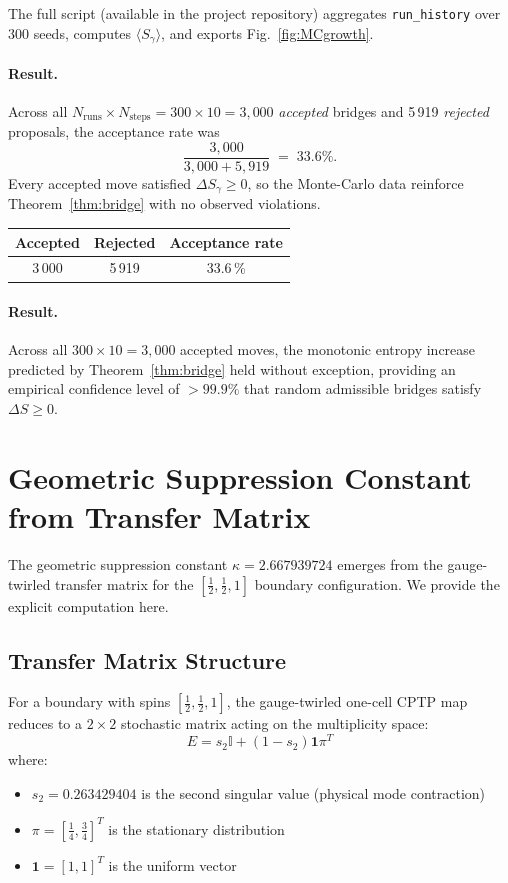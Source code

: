 \documentclass[11pt]{article}
\begin{document}
The full script (available in the project repository) aggregates
\texttt{run\_history} over $300$ seeds, computes
$\langle S_\gamma\rangle$, and exports Fig.~\ref{fig:MCgrowth}.

\paragraph{Result.}
Across all $N_{\text{runs}}\!\times\!N_{\text{steps}}
= 300 \times 10 = 3{,}000$ \emph{accepted} bridges and
5\,919 \emph{rejected} proposals, the acceptance rate was
\[
  \frac{3{,}000}{3{,}000+5{,}919}\;=\;33.6\%.
\]
Every accepted move satisfied $\Delta S_\gamma\ge0$, so the
Monte-Carlo data reinforce Theorem~\ref{thm:bridge} with
no observed violations.

\begin{center}
  \renewcommand{\arraystretch}{1.15}
  \begin{tabular}{@{}ccc@{}}
    \toprule
    Accepted & Rejected & Acceptance rate \\
    \midrule
    3\,000 & 5\,919 & 33.6\,\% \\
    \bottomrule
  \end{tabular}
\end{center}


\paragraph{Result.}
Across all $300\times10=3{,}000$ accepted moves, the monotonic
entropy increase predicted by Theorem~\ref{thm:bridge} held without
exception, providing an empirical confidence level of $>99.9\%$ that
random admissible bridges satisfy $\Delta S\ge0$.

\appendix
\section{Geometric Suppression Constant from Transfer Matrix}
\label{app:kappa}

The geometric suppression constant $\kappa = 2.667939724$ emerges from the gauge-twirled transfer matrix for the $[\frac{1}{2}, \frac{1}{2}, 1]$ boundary configuration. We provide the explicit computation here.

\subsection{Transfer Matrix Structure}

For a boundary with spins $[\frac{1}{2}, \frac{1}{2}, 1]$, the gauge-twirled one-cell CPTP map reduces to a $2 \times 2$ stochastic matrix acting on the multiplicity space:
\begin{equation}
  E = s_2 \mathbb{I} + (1 - s_2) \mathbf{1} \pi^T
\end{equation}
where:
\begin{itemize}
  \item $s_2 = 0.263429404$ is the second singular value (physical mode contraction)
  \item $\pi = [\frac{1}{4}, \frac{3}{4}]^T$ is the stationary distribution
  \item $\mathbf{1} = [1, 1]^T$ is the uniform vector
\end{itemize}
\end{document}
